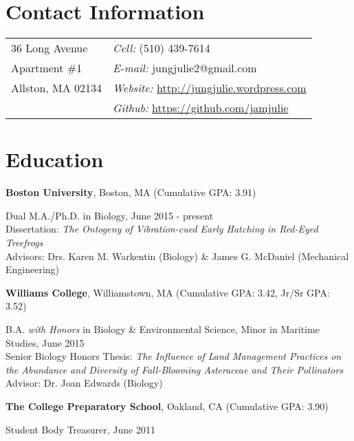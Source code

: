 \documentclass[margin,line]{res}
\begin{document}

\begin{resume}
\section{\sc Contact Information}
\vspace{.05in}
\begin{tabular}{@{}p{2in}p{4in}}
36 Long Avenue & {\it Cell:}  (510) 439-7614 \\  
Apartment \#1 & {\it E-mail:}  {\ttfamily jungjulie2@gmail.com} \\

Allston, MA 02134 & {\it Website:} \href{http://jungjulie.wordpress.com}{\ttfamily http://jungjulie.wordpress.com}\\       
& {\it Github:} \href{https://github.com/jamjulie}{\ttfamily https://github.com/jamjulie}\\     

\end{tabular}

\section{\sc Education}
{\bf Boston University}, Boston, MA (Cumulative GPA: 3.91)

\vspace*{-4mm}
Dual M.A./Ph.D. in Biology, June 2015 - present\\
Dissertation: {\it The Ontogeny of Vibration-cued Early Hatching in Red-Eyed Treefrogs}\\ 
Advisors: Drs. Karen M. Warkentin (Biology) \& James G. McDaniel (Mechanical Engineering)

{\bf Williams College}, Williamstown, MA (Cumulative GPA: 3.42, Jr/Sr GPA: 3.52)

\vspace*{-4mm}
B.A. {\it with Honors} in Biology \& Environmental Science, Minor in Maritime Studies, June 2015 \\
Senior Biology Honors Thesis: {\it The Influence of Land Management Practices on the Abundance and Diversity of Fall-Blooming Asteraceae and Their Pollinators}\\
Advisor: Dr. Joan Edwards (Biology)


{\bf The College Preparatory School}, Oakland, CA (Cumulative GPA: 3.90)

\vspace*{-4mm}
Student Body Treasurer, June 2011 


\end{resume}
\end{document}
